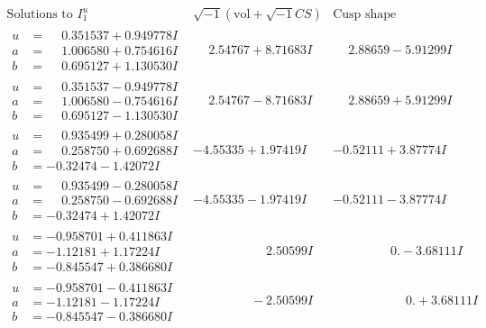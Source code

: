 \documentclass[1p]{elsarticle_modified}
\theoremstyle{definition}
\newcommand{\I}{\sqrt{-1}}
\begin{document}
$$\begin{array}{c|c|c}  
\text{Solutions to }I^u_{1}& \I (\text{vol} + \sqrt{-1}CS) & \text{Cusp shape}\\
 \hline 
\begin{aligned}
u &= \phantom{-}0.351537 + 0.949778 I \\
a &= \phantom{-}1.006580 + 0.754616 I \\
b &= \phantom{-}0.695127 + 1.130530 I\end{aligned}
 & \phantom{-}2.54767 + 8.71683 I & \phantom{-}2.88659 - 5.91299 I \\ \hline\begin{aligned}
u &= \phantom{-}0.351537 - 0.949778 I \\
a &= \phantom{-}1.006580 - 0.754616 I \\
b &= \phantom{-}0.695127 - 1.130530 I\end{aligned}
 & \phantom{-}2.54767 - 8.71683 I & \phantom{-}2.88659 + 5.91299 I \\ \hline\begin{aligned}
u &= \phantom{-}0.935499 + 0.280058 I \\
a &= \phantom{-}0.258750 + 0.692688 I \\
b &= -0.32474 - 1.42072 I\end{aligned}
 & -4.55335 + 1.97419 I & -0.52111 + 3.87774 I \\ \hline\begin{aligned}
u &= \phantom{-}0.935499 - 0.280058 I \\
a &= \phantom{-}0.258750 - 0.692688 I \\
b &= -0.32474 + 1.42072 I\end{aligned}
 & -4.55335 - 1.97419 I & -0.52111 - 3.87774 I \\ \hline\begin{aligned}
u &= -0.958701 + 0.411863 I \\
a &= -1.12181 + 1.17224 I \\
b &= -0.845547 + 0.386680 I\end{aligned}
 & \phantom{-0.000000 -}2.50599 I & \phantom{-0.000000 } 0. - 3.68111 I \\ \hline\begin{aligned}
u &= -0.958701 - 0.411863 I \\
a &= -1.12181 - 1.17224 I \\
b &= -0.845547 - 0.386680 I\end{aligned}
 & \phantom{-0.000000 } -2.50599 I & \phantom{-0.000000 -}0. + 3.68111 I \\ \hline\begin{aligned}

\end{aligned}
\end{array}$$
\end{document}
